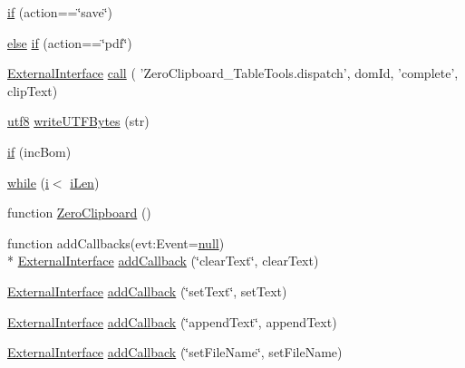 \begin{DoxyCompactItemize}
\item 
\hyperlink{class_zero_clipboard_a09ea1ca3b5895c362c3b07f009c817dc}{if} (action==\char`\"{}save\char`\"{})
\item 
\hyperlink{class_zero_clipboard_a18ece373746e9446cf10bdcf1758648c}{else} \hyperlink{class_zero_clipboard_adfee737886dc7f0cb8ceca7b048d2b13}{if} (action==\char`\"{}pdf\char`\"{})
\item 
\hyperlink{_zero_clipboard_pdf_8as_a8adbb9e92ce78f1cd583ebf4ff65e221}{External\+Interface} \hyperlink{class_zero_clipboard_a25a9af57e0d29314de3e6f227fa0fbc6}{call} ( 'Zero\+Clipboard\+\_\+\+Table\+Tools.\+dispatch', dom\+Id, 'complete', clip\+Text)
\item 
\hyperlink{class_zero_clipboard_aac6800a9ea2987f07e6cd7d3fb33dcc4}{utf8} \hyperlink{class_zero_clipboard_ab12bda244f25d23412ef1d873649fbce}{write\+U\+T\+F\+Bytes} (str)
\item 
\hyperlink{class_zero_clipboard_acac7dc45f4c0a0adb35a221040334dc3}{if} (inc\+Bom)
\item 
\hyperlink{class_zero_clipboard_a6eb9073c4b930c1aae5ec20a6646f24d}{while} (\hyperlink{class_zero_clipboard_a6223f7d5fbe005d68fc2491950a20f87}{i}$<$ \hyperlink{class_zero_clipboard_a249befb1af7eb431a5ce5b63344df54d}{i\+Len})
\item 
function \hyperlink{class_zero_clipboard_aad03b0fbbc590577440cd74299a0cab0}{Zero\+Clipboard} ()
\item 
function add\+Callbacks(evt\+:\+Event=\hyperlink{class_zero_clipboard_a07e1a60f83830226b8aac053dcef7b9c}{null}) \\*
\hyperlink{_zero_clipboard_pdf_8as_a8adbb9e92ce78f1cd583ebf4ff65e221}{External\+Interface} \hyperlink{class_zero_clipboard_af343712cdc0c26b2a44dbf6bf6ec0521}{add\+Callback} (\char`\"{}clear\+Text\char`\"{}, clear\+Text)
\item 
\hyperlink{_zero_clipboard_pdf_8as_a8adbb9e92ce78f1cd583ebf4ff65e221}{External\+Interface} \hyperlink{class_zero_clipboard_ae7b014d9d344b1d2d3e18e6ee4c9180d}{add\+Callback} (\char`\"{}set\+Text\char`\"{}, set\+Text)
\item 
\hyperlink{_zero_clipboard_pdf_8as_a8adbb9e92ce78f1cd583ebf4ff65e221}{External\+Interface} \hyperlink{class_zero_clipboard_a104132f591fb29c7078bb8e32613b237}{add\+Callback} (\char`\"{}append\+Text\char`\"{}, append\+Text)
\item 
\hyperlink{_zero_clipboard_pdf_8as_a8adbb9e92ce78f1cd583ebf4ff65e221}{External\+Interface} \hyperlink{class_zero_clipboard_a010becc475ac63e326b141261e9bfe93}{add\+Callback} (\char`\"{}set\+File\+Name\char`\"{}, set\+File\+Name)

\end{DoxyCompactItemize}
